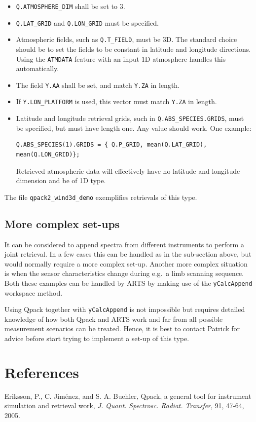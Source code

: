 \documentclass[a4paper,11pt]{article}
\begin{document}
\begin{itemize}
\item \verb|Q.ATMOSPHERE_DIM| shall be set to 3.
\item \verb|Q.LAT_GRID| and \verb|Q.LON_GRID| must be specified.
\item Atmospheric fields, such as \verb|Q.T_FIELD|, must be 3D. The standard
  choice should be to set the fields to be constant in latitude and longitude
  directions. Using the \verb|ATMDATA| feature with an input 1D atmosphere
  handles this automatically.
\item The field \verb|Y.AA| shall be set, and match \verb|Y.ZA| in length.
\item If \verb|Y.LON_PLATFORM| is used, this vector must match \verb|Y.ZA| in length.
\item Latitude and longitude retrieval grids, such in
  \verb|Q.ABS_SPECIES.GRIDS|, must be specified, but must have length one. Any
  value should work. One example:
\begin{verbatim}
Q.ABS_SPECIES(1).GRIDS = { Q.P_GRID, mean(Q.LAT_GRID), mean(Q.LON_GRID)};
\end{verbatim}
Retrieved atmospheric data will effectively have no latitude and longitude
dimension and be of 1D type.
\end{itemize}
The file \verb|qpack2_wind3d_demo| exemplifies retrievals of this type.


\subsection{More complex set-ups}
%
It can be considered to append spectra from different instruments to perform a
joint retrieval. In a few cases this can be handled as in the sub-section
above, but would normally require a more complex set-up. Another more complex
situation is when the sensor characteristics change during e.g.\ a limb
scanning sequence. Both these examples can be handled by ARTS by making use of
the \verb|yCalcAppend| workspace method.

Using Qpack together with \verb|yCalcAppend| is not impossible but requires
detailed knowledge of how both Qpack and ARTS work and far from all possible
measurement scenarios can be treated. Hence, it is best to contact Patrick
for advice before start trying to implement a set-up of this type.




\section*{References}
Eriksson, P., C. Jim\'enez, and S. A. Buehler, Qpack, a general tool for
instrument simulation and retrieval work, {\it J. Quant. Spectrosc. Radiat.
  Transfer}, 91, 47-64, 2005. \vspace{1ex}
\end{document}
